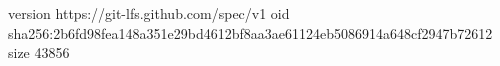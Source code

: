 version https://git-lfs.github.com/spec/v1
oid sha256:2b6fd98fea148a351e29bd4612bf8aa3ae61124eb5086914a648cf2947b72612
size 43856
